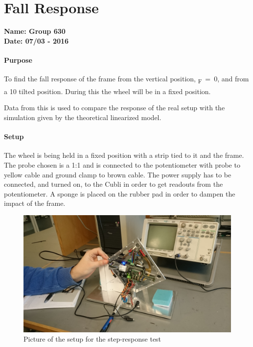 \chapter{Fall Response}\label{comparisonLinModelReal} 
\textbf{Name: Group 630}\\
\textbf{Date: 07/03 - 2016}

\subsubsection{Purpose}
To find the fall response of the frame from the vertical position, \si{\theta_F=0}, and from a \si{10^\circ} tilted position. During this the wheel will be in a fixed position.

Data from this is used to compare the response of the real setup with the simulation given by the theoretical linearized model.

\subsubsection{Setup}
The wheel is being held in a fixed position with a strip tied to it and the frame. The probe chosen is a 1:1 and is connected to the potentiometer with probe to yellow cable and ground clamp to brown cable. The power supply has to be connected, and turned on, to the Cubli in order to get readouts from the potentiometer. A sponge is placed on the rubber pad in order to dampen the impact of the frame.
\begin{figure}[H]                                   
	\centering                                        
	\includegraphics[scale=0.08]{figures/stepResponseSetup}
	\caption{Picture of the setup for the step-response test}
	\label{stepResponseTestPicture} 
\end{figure}              

